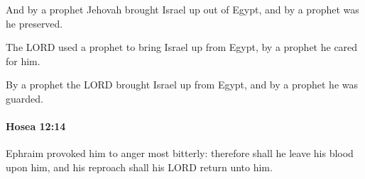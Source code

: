 			\begin{versebox}
					\item[BHS] 
					\item[LXX] 
					\item[ASV] And by a prophet Jehovah brought Israel up out of Egypt, and by a prophet was he preserved.
					\item[NIV] The LORD used a prophet to bring Israel up from Egypt, by a prophet he cared for him.
					\item[NRSV] By a prophet the LORD brought Israel up from Egypt, and by a prophet he was guarded.
			\end{versebox}

		\paragraph{Hosea 12:14} %
			\label{HOSEA-12-14}

			Ephraim provoked him to anger most bitterly: therefore shall he leave his blood upon him, and his reproach shall his LORD return unto him.

